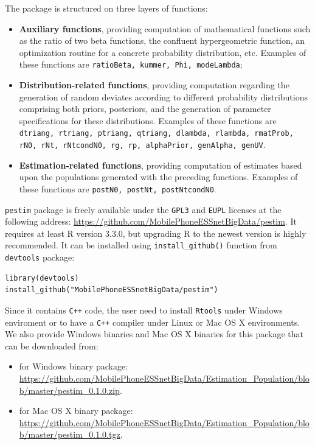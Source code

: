 \documentclass[12pt, a4paper]{article}
\begin{document}
The package is structured on three layers of functions:
\begin{itemize}
	\item \textbf{Auxiliary functions}, providing computation of mathematical functions 
such as the ratio of two beta functions, the confluent hypergeometric function, 
an optimization routine for a concrete probability distribution, etc. 
Examples of these functions are \texttt{ratioBeta, kummer, Phi, modeLambda};
	\item \textbf{Distribution-related functions}, providing computation regarding
the generation of random deviates according to different probability distributions 
comprising both priors, posteriors, and the generation of parameter specifications 
for these distributions. Examples of these functions are 
\texttt{dtriang, rtriang, ptriang, qtriang, dlambda, rlambda, rmatProb, rN0, rNt, rNtcondN0, rg, rp, alphaPrior, genAlpha, genUV}.
\item \textbf{Estimation-related functions}, providing computation of estimates 
based upon the populations generated with the preceding functions. 
Examples of these functions are \texttt{postN0, postNt, postNtcondN0}.
\end{itemize}

\texttt{pestim} package is freely available under the \texttt{GPL3} and \texttt{EUPL} licenses
at the following address: \url{https://github.com/MobilePhoneESSnetBigData/pestim}. It requires 
at least R version 3.3.0, but upgrading R to the newest version is highly recommended.
It can be installed using \texttt{install\_github()} function from \texttt{devtools} package:
\begin{verbatim}
library(devtools)
install_github("MobilePhoneESSnetBigData/pestim")
\end{verbatim}

Since it contains \texttt{C++} code, the user need to install \texttt{Rtools} under Windows 
enviroment or to have a  \texttt{C++}  compiler under Linux or Mac OS X environments.
We also provide Windows binaries and Mac OS X binaries for this package that can be downloaded from:
\begin{itemize}
	\item for Windows binary package: \url{https://github.com/MobilePhoneESSnetBigData/Estimation_Population/blob/master/pestim_0.1.0.zip}.
	\item for Mac OS X binary package: \url{https://github.com/MobilePhoneESSnetBigData/Estimation_Population/blob/master/pestim_0.1.0.tgz}.
\end{itemize}
\end{document}
